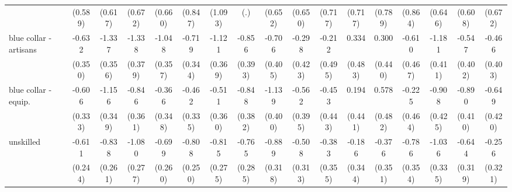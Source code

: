 {\begin{tabular}{l*{16}{c}}
                    &     (0.589)         &     (0.617)         &     (0.672)         &     (0.660)         &     (0.847)         &     (1.093)         &         (.)         &     (0.652)         &     (0.650)         &     (0.717)         &     (0.717)         &     (0.789)         &     (0.864)         &     (0.646)         &     (0.608)         &     (0.672)         \\
[1em]
blue collar - artisans&      -0.632         &      -1.337\sym{***}&      -1.338\sym{***}&      -1.048\sym{**} &      -0.719\sym{*}  &      -1.121\sym{**} &      -0.856\sym{*}  &      -0.706         &      -0.298         &      -0.212         &       0.334         &       0.300         &      -0.610         &      -1.181\sym{**} &      -0.547         &      -0.466         \\
                    &     (0.350)         &     (0.356)         &     (0.379)         &     (0.357)         &     (0.344)         &     (0.369)         &     (0.393)         &     (0.405)         &     (0.423)         &     (0.495)         &     (0.483)         &     (0.440)         &     (0.467)         &     (0.411)         &     (0.402)         &     (0.403)         \\
[1em]
blue collar - equip.&      -0.606         &      -1.156\sym{***}&      -0.846\sym{*}  &      -0.366         &      -0.462         &      -0.511         &      -0.848\sym{*}  &      -1.139\sym{**} &      -0.562         &      -0.453         &       0.194         &       0.578         &      -0.225         &      -0.908\sym{*}  &      -0.890\sym{*}  &      -0.649         \\
                    &     (0.333)         &     (0.349)         &     (0.361)         &     (0.348)         &     (0.335)         &     (0.360)         &     (0.382)         &     (0.400)         &     (0.395)         &     (0.443)         &     (0.441)         &     (0.482)         &     (0.464)         &     (0.425)         &     (0.410)         &     (0.420)         \\
[1em]
unskilled           &      -0.611\sym{*}  &      -0.838\sym{**} &      -1.080\sym{***}&      -0.699\sym{**} &      -0.808\sym{**} &      -0.815\sym{**} &      -0.765\sym{**} &      -0.889\sym{**} &      -0.508         &      -0.383         &      -0.186         &      -0.376         &      -0.786\sym{*}  &      -1.036\sym{**} &      -0.644\sym{*}  &      -0.256         \\
                    &     (0.244)         &     (0.261)         &     (0.277)         &     (0.260)         &     (0.250)         &     (0.275)         &     (0.285)         &     (0.318)         &     (0.313)         &     (0.355)         &     (0.344)         &     (0.351)         &     (0.354)         &     (0.335)         &     (0.319)         &     (0.321)         \\

\end{tabular}}
